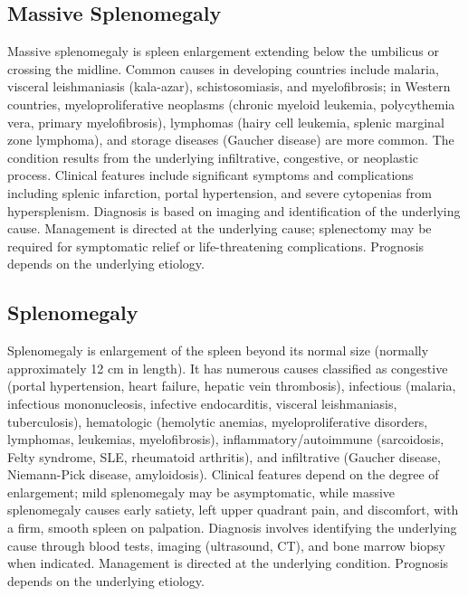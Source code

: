 \subsection{Massive Splenomegaly}
\label{sec:Massive Splenomegaly}
Massive splenomegaly is spleen enlargement extending below the umbilicus or crossing the midline. Common causes in developing countries include malaria, visceral leishmaniasis (kala-azar), schistosomiasis, and myelofibrosis; in Western countries, myeloproliferative neoplasms (chronic myeloid leukemia, polycythemia vera, primary myelofibrosis), lymphomas (hairy cell leukemia, splenic marginal zone lymphoma), and storage diseases (Gaucher disease) are more common. The condition results from the underlying infiltrative, congestive, or neoplastic process. Clinical features include significant symptoms and complications including splenic infarction, portal hypertension, and severe cytopenias from hypersplenism. Diagnosis is based on imaging and identification of the underlying cause. Management is directed at the underlying cause; splenectomy may be required for symptomatic relief or life-threatening complications. Prognosis depends on the underlying etiology.

\subsection{Splenomegaly}
\label{sec:Splenomegaly}
Splenomegaly is enlargement of the spleen beyond its normal size (normally approximately 12 cm in length). It has numerous causes classified as congestive (portal hypertension, heart failure, hepatic vein thrombosis), infectious (malaria, infectious mononucleosis, infective endocarditis, visceral leishmaniasis, tuberculosis), hematologic (hemolytic anemias, myeloproliferative disorders, lymphomas, leukemias, myelofibrosis), inflammatory/autoimmune (sarcoidosis, Felty syndrome, SLE, rheumatoid arthritis), and infiltrative (Gaucher disease, Niemann-Pick disease, amyloidosis). Clinical features depend on the degree of enlargement; mild splenomegaly may be asymptomatic, while massive splenomegaly causes early satiety, left upper quadrant pain, and discomfort, with a firm, smooth spleen on palpation. Diagnosis involves identifying the underlying cause through blood tests, imaging (ultrasound, CT), and bone marrow biopsy when indicated. Management is directed at the underlying condition. Prognosis depends on the underlying etiology.

